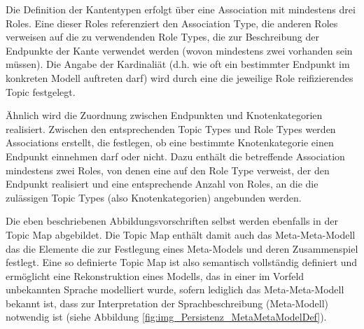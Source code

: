 Die Definition der Kantentypen erfolgt über eine Association mit mindestens drei Roles. 
Eine dieser Roles referenziert den Association Type, die anderen Roles verweisen auf die zu verwendenden Role Types, die zur Beschreibung der Endpunkte der Kante verwendet werden (wovon mindestens zwei vorhanden sein müssen). Die Angabe der Kardinaliät (d.h. wie oft ein bestimmter Endpunkt im konkreten Modell auftreten darf) wird durch eine die jeweilige Role reifizierendes Topic festgelegt.

Ähnlich wird die Zuordnung zwischen Endpunkten und Knotenkategorien realisiert. Zwischen den entsprechenden Topic Types und Role Types werden Associations erstellt, die festlegen, ob eine bestimmte Knotenkategorie einen Endpunkt einnehmen darf oder nicht. Dazu enthält die betreffende Association mindestens zwei Roles, von denen eine auf den Role Type verweist, der den Endpunkt realisiert und eine entsprechende Anzahl von Roles, an die die zulässigen Topic Types (also Knotenkategorien) angebunden werden.

Die eben beschriebenen Abbildungsvorschriften selbst werden ebenfalls in der Topic Map abgebildet. Die Topic Map enthält damit auch das Meta-Meta-Modell das die Elemente die zur Festlegung eines Meta-Models und deren Zusammenspiel festlegt. Eine so definierte Topic Map ist also semantisch vollständig definiert und ermöglicht eine Rekonstruktion eines Modells, das in einer im Vorfeld unbekannten Sprache modelliert wurde, sofern lediglich das Meta-Meta-Modell bekannt ist, dass zur Interpretation der Sprachbeschreibung (Meta-Modell) notwendig ist (siehe Abbildung \ref{fig:img_Persistenz_MetaMetaModelDef}).

